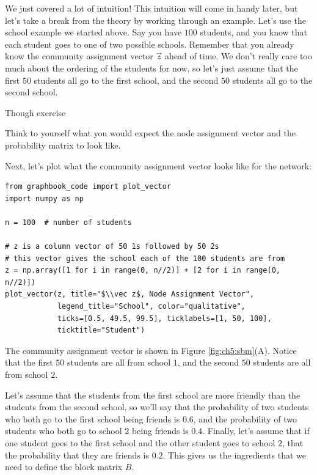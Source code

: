 We just covered a lot of intuition! This intuition will come in handy later, but let's take a break from the theory by working through an example. Let's use the school example we started above. Say you have $100$ students, and you know that each student goes to one of two possible schools. Remember that you already know the community assignment vector $\vec{z}$ ahead of time. We don't really care too much about the ordering of the students for now, so let's just assume that the first $50$ students all go to the first school, and the second $50$ students all go to the second school. 

\begin{floatingbox}[h]\caption{Though exercise}
Think to yourself what you would expect the node assignment vector and the probability matrix to look like.
\end{floatingbox}

Next, let's plot what the community assignment vector looks like for the network:

\begin{lstlisting}[style=python]
from graphbook_code import plot_vector
import numpy as np

n = 100  # number of students

# z is a column vector of 50 1s followed by 50 2s
# this vector gives the school each of the 100 students are from
z = np.array([1 for i in range(0, n//2)] + [2 for i in range(0, n//2)])
plot_vector(z, title="$\\vec z$, Node Assignment Vector",
            legend_title="School", color="qualitative", 
            ticks=[0.5, 49.5, 99.5], ticklabels=[1, 50, 100],
            ticktitle="Student")
\end{lstlisting}

The community assignment vector is shown in Figure \ref{fig:ch5:sbm}(A). Notice that the first $50$ students are all from school $1$, and the second $50$ students are all from school $2$.

Let's assume that the students from the first school are more friendly than the students from the second school, so we'll say that the probability of two students who both go to the first school being friends is $0.6$, and the probability of two students who both go to school $2$ being friends is $0.4$. Finally, let's assume that if one student goes to the first school and the other student goes to school $2$, that the probability that they are friends is $0.2$. This gives us the ingredients that we need to define the block matrix $B$. 

